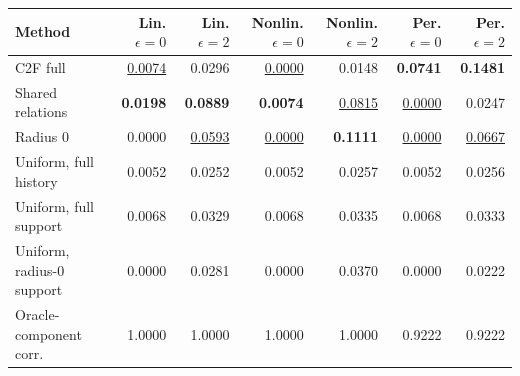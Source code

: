 \setlength{\tabcolsep}{3pt}
\begin{tabular}{lrrrrrr}
\toprule
Method & Lin. $\epsilon=0$ & Lin. $\epsilon=2$ & Nonlin. $\epsilon=0$ & Nonlin. $\epsilon=2$ & Per. $\epsilon=0$ & Per. $\epsilon=2$\\
\midrule
C2F full & \underline{0.0074} & 0.0296 & \underline{0.0000} & 0.0148 & \textbf{0.0741} & \textbf{0.1481}\\
Shared relations & \textbf{0.0198} & \textbf{0.0889} & \textbf{0.0074} & \underline{0.0815} & \underline{0.0000} & 0.0247\\
Radius 0 & 0.0000 & \underline{0.0593} & \underline{0.0000} & \textbf{0.1111} & \underline{0.0000} & \underline{0.0667}\\
Uniform, full history & 0.0052 & 0.0252 & 0.0052 & 0.0257 & 0.0052 & 0.0256\\
Uniform, full support & 0.0068 & 0.0329 & 0.0068 & 0.0335 & 0.0068 & 0.0333\\
Uniform, radius-0 support & 0.0000 & 0.0281 & 0.0000 & 0.0370 & 0.0000 & 0.0222\\
Oracle-component corr. & 1.0000 & 1.0000 & 1.0000 & 1.0000 & 0.9222 & 0.9222\\
\bottomrule
\end{tabular}
